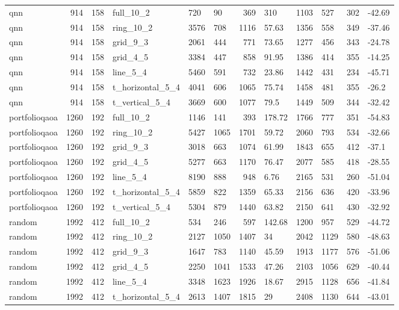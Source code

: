 \begin{longtable}{lrrlllrlllrl}
qnn & 914 & 158 & full\_10\_2 & 720 & 90 & 369 & 310 & 1103 & 527 & 302 & -42.69 \\
qnn & 914 & 158 & ring\_10\_2 & 3576 & 708 & 1116 & 57.63 & 1356 & 558 & 349 & -37.46 \\
qnn & 914 & 158 & grid\_9\_3 & 2061 & 444 & 771 & 73.65 & 1277 & 456 & 343 & -24.78 \\
qnn & 914 & 158 & grid\_4\_5 & 3384 & 447 & 858 & 91.95 & 1386 & 414 & 355 & -14.25 \\
qnn & 914 & 158 & line\_5\_4 & 5460 & 591 & 732 & 23.86 & 1442 & 431 & 234 & -45.71 \\
qnn & 914 & 158 & t\_horizontal\_5\_4 & 4041 & 606 & 1065 & 75.74 & 1458 & 481 & 355 & -26.2 \\
qnn & 914 & 158 & t\_vertical\_5\_4 & 3669 & 600 & 1077 & 79.5 & 1449 & 509 & 344 & -32.42 \\
portfolioqaoa & 1260 & 192 & full\_10\_2 & 1146 & 141 & 393 & 178.72 & 1766 & 777 & 351 & -54.83 \\
portfolioqaoa & 1260 & 192 & ring\_10\_2 & 5427 & 1065 & 1701 & 59.72 & 2060 & 793 & 534 & -32.66 \\
portfolioqaoa & 1260 & 192 & grid\_9\_3 & 3018 & 663 & 1074 & 61.99 & 1843 & 655 & 412 & -37.1 \\
portfolioqaoa & 1260 & 192 & grid\_4\_5 & 5277 & 663 & 1170 & 76.47 & 2077 & 585 & 418 & -28.55 \\
portfolioqaoa & 1260 & 192 & line\_5\_4 & 8190 & 888 & 948 & 6.76 & 2165 & 531 & 260 & -51.04 \\
portfolioqaoa & 1260 & 192 & t\_horizontal\_5\_4 & 5859 & 822 & 1359 & 65.33 & 2156 & 636 & 420 & -33.96 \\
portfolioqaoa & 1260 & 192 & t\_vertical\_5\_4 & 5304 & 879 & 1440 & 63.82 & 2150 & 641 & 430 & -32.92 \\
random & 1992 & 412 & full\_10\_2 & 534 & 246 & 597 & 142.68 & 1200 & 957 & 529 & -44.72 \\
random & 1992 & 412 & ring\_10\_2 & 2127 & 1050 & 1407 & 34 & 2042 & 1129 & 580 & -48.63 \\
random & 1992 & 412 & grid\_9\_3 & 1647 & 783 & 1140 & 45.59 & 1913 & 1177 & 576 & -51.06 \\
random & 1992 & 412 & grid\_4\_5 & 2250 & 1041 & 1533 & 47.26 & 2103 & 1056 & 629 & -40.44 \\
random & 1992 & 412 & line\_5\_4 & 3348 & 1623 & 1926 & 18.67 & 2915 & 1128 & 656 & -41.84 \\
random & 1992 & 412 & t\_horizontal\_5\_4 & 2613 & 1407 & 1815 & 29 & 2408 & 1130 & 644 & -43.01 \\

\end{longtable}
